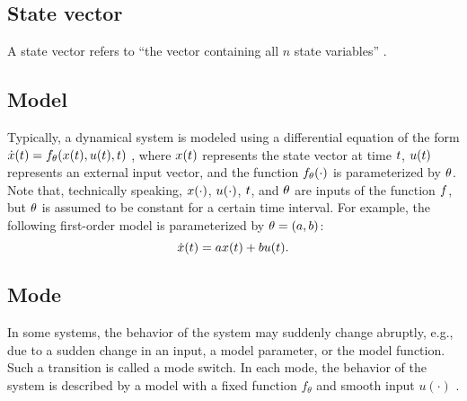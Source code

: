 \subsection{State vector}
\label{sec:state vector}
A state vector refers to ``the vector containing all $n$ state variables'' \autocite[p.~233]{dorf2011modern}.

\subsection{Model}
\label{sec:model}

Typically, a dynamical system is modeled using a differential equation of the form $\dot{x}(t)=f_{\theta}(x(t), u(t), t)$ \autocite{norman2011control}, where $x(t)$ represents the state vector at time $t$, $u(t)$ represents an external input vector, and the function $f_{\theta}(\cdot)$ is parameterized by $\theta$.  Note that, technically speaking, $x(\cdot)$, $u(\cdot)$, $t$, and $\theta$ are inputs of the function $f$, but $\theta$ is assumed to be constant for a certain time interval. For example, the following first-order model is parameterized by $\theta=(a,b)$:
\begin{equation}
	\dot{x}(t) = a x(t) + b u(t).
\end{equation}


\subsection{Mode}
\label{sec:mode}

In some systems, the behavior of the system may suddenly change abruptly, e.g., due to a sudden change in an input, a model parameter, or the model function. Such a transition is called a mode switch.
In each mode, the behavior of the system is described by a model with a fixed function $f_{\theta}$ and smooth input $u(\cdot)$ \autocite{deschutter2000optimal}.

